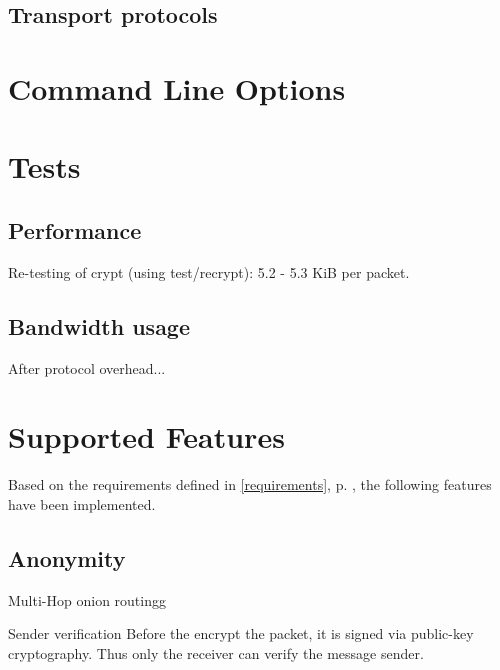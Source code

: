 \subsection{Transport protocols}
\section{Command Line Options}

\section{Tests}
\subsection{Performance}
Re-testing of crypt (using test/recrypt): 5.2 - 5.3 KiB per packet.

\subsection{Bandwidth usage}
After protocol overhead...



\section{Supported Features}
Based on the requirements defined in \ref{requirements}, 
p. \pageref{requirements}, the following features have been implemented. 

\subsection{Anonymity}
Multi-Hop onion routingg

Sender verification
Before the encrypt the packet, it is signed via public-key
cryptography\cite{pgp-1}. Thus only the receiver can verify the message sender.

